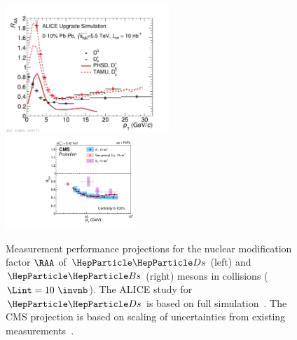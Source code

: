 \begin{figure}[!t]
\centering
\includegraphics[width=0.55\textwidth]{hf/figures/ALICEUpgrade_D0_Ds_RAA_YR.pdf}
\includegraphics[width=0.44\textwidth]{hf/figures/CMS_B_Bs_RAA.pdf}
\caption{Measurement performance projections for the nuclear modification factor  $\RAA$ of $\PDs$ (left) and $\PBs$ (right) mesons in \PbPb collisions ($\Lint=10~\invnb$). The ALICE study for $\PDs$ is based on full simulation~\cite{Abelev:1625842}. The CMS projection is based on scaling of uncertainties from existing measurements~\cite{CMS-PAS-FTR-17-002}.}
\label{fig:HFDsBs}
\end {figure}

